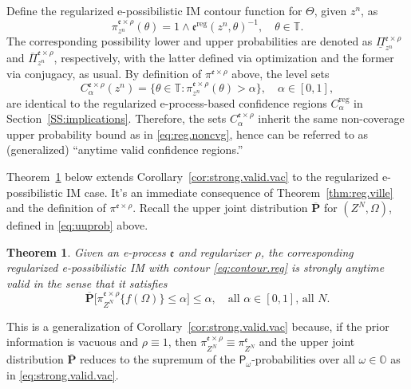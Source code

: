\documentclass[a4paper, 12pt]{article}
\theoremstyle{plain}
\newtheorem{thm}{Theorem}
\theoremstyle{definition}
\theoremstyle{remark}
\newcommand{\prob}{\mathsf{P}}
\newcommand{\OO}{\mathbb{O}}
\newcommand{\TT}{\mathbb{T}}
\newcommand{\lPi}{\underline{\Pi}}
\newcommand{\uPi}{\overline{\Pi}}
\newcommand{\uuprob}{\mathbf{\overline{P}}}
\newcommand{\eval}{\mathfrak{e}}
\begin{document}
Define the regularized e-possibilistic IM contour function for $\Theta$, given $z^n$, as 
\begin{equation}
\label{eq:contour.reg}
\pi_{z^n}^{\eval \times \rho}(\theta) = 1 \wedge \eval^\text{reg}(z^n, \theta)^{-1}, \quad \theta \in \TT. 
\end{equation}
The corresponding possibility lower and upper probabilities are denoted as $\lPi_{z^n}^{\eval \times \rho}$ and $\uPi_{z^n}^{\eval \times \rho}$, respectively, with the latter defined via optimization and the former via conjugacy, as usual.  By definition of $\pi^{\eval \times \rho}$ above, the level sets 
\[ C_\alpha^{\eval \times \rho}(z^n) = \{ \theta \in \TT: \pi_{z^n}^{\eval \times \rho}(\theta) > \alpha \}, \quad \alpha \in [0,1], \]
are identical to the regularized e-process-based confidence regions $C_\alpha^\text{reg}$ in Section~\ref{SS:implications}.  Therefore, the sets $C_\alpha^{\eval \times \rho}$ inherit the same non-coverage upper probability bound as in \eqref{eq:reg.noncvg}, hence can be referred to as (generalized) ``anytime valid confidence regions.'' 

Theorem~\ref{thm:strong.valid} below extends Corollary~\ref{cor:strong.valid.vac} to the regularized e-possibilistic IM case.  It's an immediate consequence of Theorem~\ref{thm:reg.ville} and the definition of $\pi^{\eval \times \rho}$.  Recall the upper joint distribution $\uuprob$ for $(Z^N,\Omega)$, defined in \eqref{eq:uuprob} above.  

\begin{thm}
\label{thm:strong.valid}
Given an e-process $\eval$ and regularizer $\rho$, the corresponding regularized e-possibilistic IM with contour \eqref{eq:contour.reg} is strongly anytime valid in the sense that it satisfies 
\begin{equation}
\label{eq:strong.valid}
\uuprob\bigl[ \pi_{Z^N}^{\eval \times \rho}\{ f(\Omega) \} \leq \alpha \bigr] \leq \alpha, \quad \text{all $\alpha \in [0,1]$, all $N$}.
\end{equation}
\end{thm}

This is a generalization of Corollary~\ref{cor:strong.valid.vac} because, if the prior information is vacuous and $\rho \equiv 1$, then $\pi_{Z^N}^{\eval \times \rho} \equiv \pi_{Z^N}^\eval$ and the upper joint distribution $\uuprob$ reduces to the supremum of the $\prob_\omega$-probabilities over all $\omega \in \OO$ as in \eqref{eq:strong.valid.vac}. 
\end{document}
